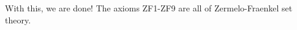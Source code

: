 \documentclass{whrartcl}
\begin{document}
\begin{remark}
  With this, we are done! The axioms ZF1-ZF9 are all of Zermelo-Fraenkel set theory.
\end{remark}





\end{document}
